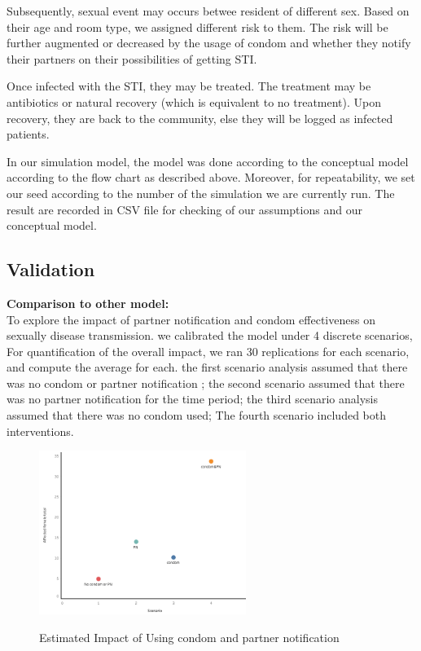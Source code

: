 \documentclass{article}
\begin{document}
\begin{normalsize}
Subsequently, sexual event may occurs betwee resident of different sex. Based on their age and room type, we assigned different risk to them. The risk will be further augmented or decreased by the usage of condom and whether they notify their partners on their possibilities of getting STI.

Once infected with the STI, they may be treated. The treatment may be antibiotics or natural recovery (which is equivalent to no treatment). Upon recovery, they are back to the community, else they will be logged as infected patients.

In our simulation model, the model was done according to the conceptual model according to the flow chart as described above. Moreover, for repeatability, we set our seed according to the number of the simulation we are currently run. The result are recorded in CSV file for checking of our assumptions and our conceptual model. 

\subsection{Validation}
\textbf{Comparison to other model:}\\

To explore the impact of partner notification and condom effectiveness on sexually disease transmission. we calibrated the model under 4 discrete scenarios, For quantification of the overall impact, we ran 30 replications for each scenario, and compute the average for each. the first scenario analysis assumed that there was no condom or partner notification ; the second scenario assumed that there was no partner notification for the time period; the third scenario analysis assumed that there was no condom used; The fourth scenario included both interventions.\\

\begin{figure}[H]
\caption{Estimated Impact of Using condom and partner notification}
\centering
\includegraphics[width=0.6\textwidth]{plt1.png}
\label{fig:plt1}
\end{figure}


\end{normalsize}
\end{document}
